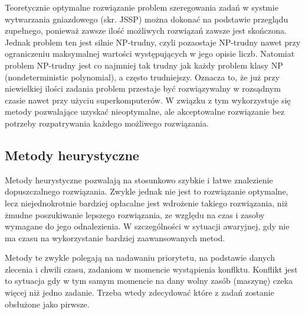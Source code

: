 \documentclass[twoside]{kInzynierka}
\begin{document}
Teoretycznie optymalne rozwiązanie problem szeregowania zadań w systmie wytwarzania gniazdowego (skr. JSSP) można dokonać na podstawie przeglądu zupełnego, ponieważ zawsze ilość możliwych rozwiązań zawsze jest skończona. Jednak problem ten jest silnie NP-trudny, czyli pozaostaje NP-trudny nawet przy ograniczeniu maksymalnej wartości występujących w jego opisie liczb. Natomiat problem NP-trudny jest co najmniej tak trudny jak każdy problem klasy NP (nondeterministic polynomial), a często trudniejszy. Oznacza to, że już przy niewielkiej ilości zadania problem przestaje być rozwiązywalny w rozsądnym czasie nawet przy użyciu superkomputerów. W związku z tym wykorzystuje się metody pozwalające uzyskać nieoptymalne, ale akceptowalne rozwiązanie bez potrzeby rozpatrywania każdego możliwego rozwiązania. \cite{np}

\subsection     {Metody heurystyczne}
Metody heurystyczne pozwalają na stosunkowo szybkie i łatwe znalezienie dopuszczalnego rozwiązania. Zwykle jednak nie jest to rozwiązanie optymalne, lecz niejednokrotnie bardziej opłacalne jest wdrożenie takiego rozwiązania, niż żmudne poszukiwanie lepszego rozwiązania, ze względu na czas i zasoby wymagane do jego odnalezienia. W szczególności w sytuacji awaryjnej, gdy nie ma czasu na wykorzystanie bardziej zaawansowanych metod. 

Metody te zwykle polegają na nadawaniu priorytetu, na podstawie danych zlecenia i chwili czasu, zadaniom w momencie wystąpienia konflktu. Konflikt jest to sytuacja gdy w tym samym momencie na dany wolny zasób (maszynę) czeka więcej niż jedno zadanie. Trzeba wtedy zdecydować które z zadań zostanie obsłużone jako pirwsze. 
\end{document}
